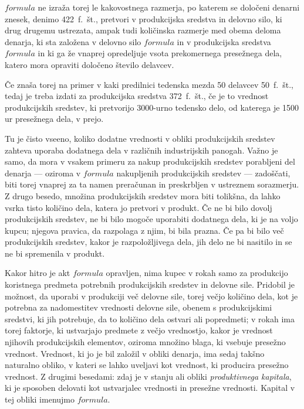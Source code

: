\documentclass[kapital_02.tex]{subfiles}
\begin{document}
\( formula \) ne izraža torej le kakovostnega razmerja, po katerem se določeni denarni znesek, denimo 422~f.~št., pretvori v produkcijska sredstva in delovno silo, ki drug drugemu ustrezata, ampak tudi količinska razmerje med obema deloma denarja, ki sta založena v delovno silo \( formula \) in v produkcijska sredstva \( formula \) in ki ga že vnaprej opredeljuje vsota prekomernega presežnega dela, katero mora opraviti določeno število delavcev.

Če znaša torej na primer v kaki predilnici tedenska mezda 50 delavcev 50~f.~št., tedaj je treba izdati za produkcijska sredstva 372~f.~št., če je to vrednost produkcijskih sredstev, ki pretvorijo 3000-urno tedensko delo, od katerega je 1500 ur presežnega dela, v prejo.

Tu je čisto vseeno, koliko dodatne vrednosti v obliki produkcijskih sredstev zahteva uporaba dodatnega dela v različnih industrijskih panogah. Važno je samo, da mora v vsakem primeru za nakup produkcijskih sredstev porabljeni del denarja --- oziroma v \( formula \) nakupljenih produkcijskih sredstev --- zadoščati, biti torej vnaprej za ta namen preračunan in preskrbljen v ustreznem sorazmerju. Z drugo besedo, množina produkcijskih sredstev mora biti tolikšna, da lahko vsrka tisto količino dela, katera jo pretvori v produkt. Če ne bi bilo dovolj produkcijskih sredstev, ne bi bilo mogoče uporabiti dodatnega dela, ki je na voljo kupcu; njegova pravica, da razpolaga z njim, bi bila prazna. Če pa bi bilo več produkcijskih sredstev, kakor je razpoložljivega dela, jih delo ne bi nasitilo in se ne bi spremenila v produkt.

Kakor hitro je akt \( formula \) opravljen, nima kupec v rokah samo za produkcijo koristnega predmeta potrebnih produkcijskih sredstev in delovne sile. Pridobil je možnost, da uporabi v produkciji več delovne sile, torej večjo količino dela, kot je potrebna za nadomestitev vrednosti delovne sile, obenem s produkcijskimi sredstvi, ki jih potrebuje, da to količino dela ostvari ali popredmeti; v rokah ima torej faktorje, ki ustvarjajo predmete z večjo vrednostjo, kakor je vrednost njihovih produkcijskih elementov, oziroma množino blaga, ki vsebuje presežno vrednost. Vrednost, ki jo je bil založil v obliki denarja, ima sedaj takšno naturalno obliko, v kateri se lahko uveljavi kot vrednost, ki producira presežno vrednost. Z drugimi besedami: zdaj je v stanju ali obliki \emph{produktivnega kapitala}, ki je sposoben delovati kot ustvarjalec vrednosti in presežne vrednosti. Kapital v tej obliki imenujmo \( formula \).
\end{document}
